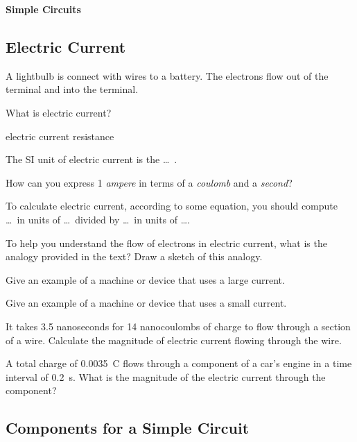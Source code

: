 \documentclass[]{exam}
\begin{document}
\clearpage



\textbf{\Large Simple Circuits}

\subsection{Electric Current}

\begin{questions}
\question
A lightbulb is connect with wires to a battery. The electrons flow out of the \fillin[negative ] terminal and into the \fillin[positive ] terminal.


\question
What is electric current?

\begin{randomizechoices}
    \correctchoice \glsdesc{electric current}
    \choice \glsdesc{resistance}
\end{randomizechoices}


\question
The SI unit of electric current is the \dots\ .


\question
How can you express 1 \textit{ampere} in terms of a \textit{coulomb} and a \textit{second}?


\question
To calculate electric current, according to some equation, you should compute \dots\ in units of \dots\ divided by \dots\ in units of \dots .


\question
To help you understand the flow of electrons in electric current, what is the analogy provided in the text? Draw a sketch of this analogy.


\question
Give an example of a machine or device that uses a large current.


\question
Give an example of a machine or device that uses a small current.


\question
It takes 3.5 nanoseconds for 14 nanocoulombs of charge to flow through a section of a wire. Calculate the magnitude of electric current flowing through the wire.


\question
A total charge of \qty{0.0035}{C} flows through a component of a car's engine in a time interval of \qty{0.2}{s}. What is the magnitude of the electric current through the component?

\end{questions}

\clearpage

\subsection{Components for a Simple Circuit}
\end{document}
